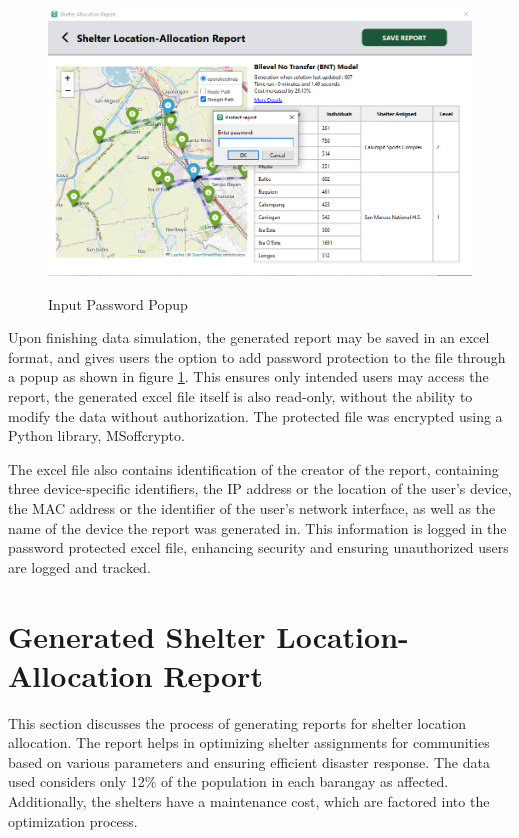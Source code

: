\documentclass[12pt,a4paper,]{article}
\begin{document}
	\begin{figure}[h!]
		\caption{Input Password Popup}
		\centering
		\includegraphics[width=\columnwidth]{Chapter 4/alloc report pass}
		\label{passPop}
	\end{figure}
	Upon finishing data simulation, the generated report may be saved in an excel format, and gives users the option to add password protection to the file through a popup as shown in figure \ref{passPop}. This ensures only intended users may access the report, the generated excel file itself is also read-only, without the ability to modify the data without authorization. The protected file was encrypted using a Python library, MSoffcrypto.
	
	The excel file also contains identification of the creator of the report, containing three device-specific identifiers, the IP address or the location of the user’s device, the MAC address or the identifier of the user’s network interface, as well as the name of the device the report was generated in. This information is logged in the password protected excel file, enhancing security and ensuring unauthorized users are logged and tracked. 
	
	\section{Generated Shelter Location-Allocation Report}
	This section discusses the process of generating reports for shelter location allocation. The report helps in optimizing shelter assignments for communities based on various parameters and ensuring efficient disaster response. The data used considers only 12\% of the population in each barangay as affected. Additionally, the shelters have a maintenance cost, which are factored into the optimization process.
	
\end{document}
